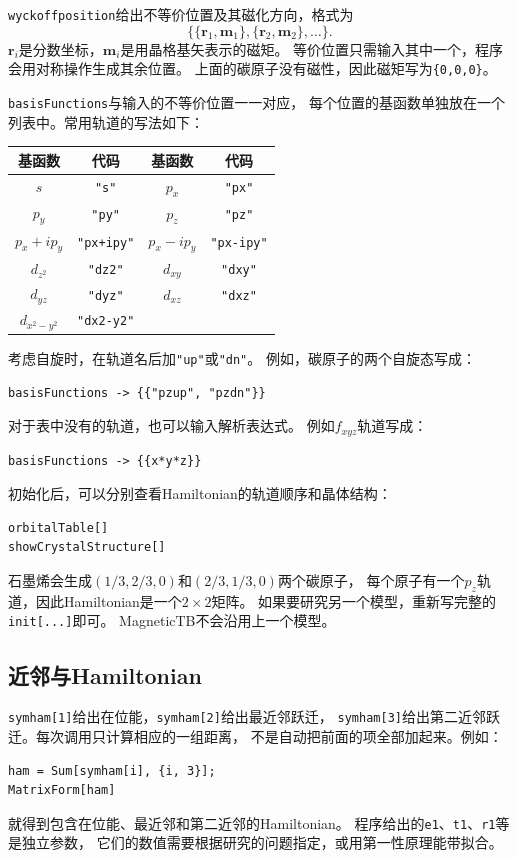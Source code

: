 \documentclass[titlepage,a4paper,12pt,AutoFakeBold]{article}
\begin{document}
\lstinline|wyckoffposition|给出不等价位置及其磁化方向，格式为
\[
\{\{\boldsymbol r_1,\boldsymbol m_1\},
  \{\boldsymbol r_2,\boldsymbol m_2\},\ldots\}.
\]
$\boldsymbol r_i$是分数坐标，$\boldsymbol m_i$是用晶格基矢表示的磁矩。
等价位置只需输入其中一个，程序会用对称操作生成其余位置。
上面的碳原子没有磁性，因此磁矩写为\lstinline|{0,0,0}|。

\lstinline|basisFunctions|与输入的不等价位置一一对应，
每个位置的基函数单独放在一个列表中。常用轨道的写法如下：
\begin{table}[H]
\centering
\begin{tabular}{cc|cc}
\hline
基函数 & 代码 & 基函数 & 代码\\
\hline
$s$ & \lstinline|"s"| & $p_x$ & \lstinline|"px"|\\
$p_y$ & \lstinline|"py"| & $p_z$ & \lstinline|"pz"|\\
$p_x+ip_y$ & \lstinline|"px+ipy"| & $p_x-ip_y$ & \lstinline|"px-ipy"|\\
$d_{z^2}$ & \lstinline|"dz2"| & $d_{xy}$ & \lstinline|"dxy"|\\
$d_{yz}$ & \lstinline|"dyz"| & $d_{xz}$ & \lstinline|"dxz"|\\
$d_{x^2-y^2}$ & \lstinline|"dx2-y2"| & &\\
\hline
\end{tabular}
\end{table}
考虑自旋时，在轨道名后加\lstinline|"up"|或\lstinline|"dn"|。
例如，碳原子的两个自旋态写成：
\begin{lstlisting}[numbers=none]
basisFunctions -> {{"pzup", "pzdn"}}
\end{lstlisting}
对于表中没有的轨道，也可以输入解析表达式。
例如$f_{xyz}$轨道写成：
\begin{lstlisting}[numbers=none]
basisFunctions -> {{x*y*z}}
\end{lstlisting}

初始化后，可以分别查看Hamiltonian的轨道顺序和晶体结构：
\begin{lstlisting}[numbers=none]
orbitalTable[]
showCrystalStructure[]
\end{lstlisting}
石墨烯会生成$(1/3,2/3,0)$和$(2/3,1/3,0)$两个碳原子，
每个原子有一个$p_z$轨道，因此Hamiltonian是一个$2\times2$矩阵。
如果要研究另一个模型，重新写完整的\lstinline|init[...]|即可。
MagneticTB不会沿用上一个模型。

\subsection{近邻与Hamiltonian}
\lstinline|symham[1]|给出在位能，\lstinline|symham[2]|给出最近邻跃迁，
\lstinline|symham[3]|给出第二近邻跃迁。每次调用只计算相应的一组距离，
不是自动把前面的项全部加起来。例如：
\begin{lstlisting}
ham = Sum[symham[i], {i, 3}];
MatrixForm[ham]
\end{lstlisting}
就得到包含在位能、最近邻和第二近邻的Hamiltonian。
程序给出的\lstinline|e1|、\lstinline|t1|、\lstinline|r1|等是独立参数，
它们的数值需要根据研究的问题指定，或用第一性原理能带拟合。
\end{document}
